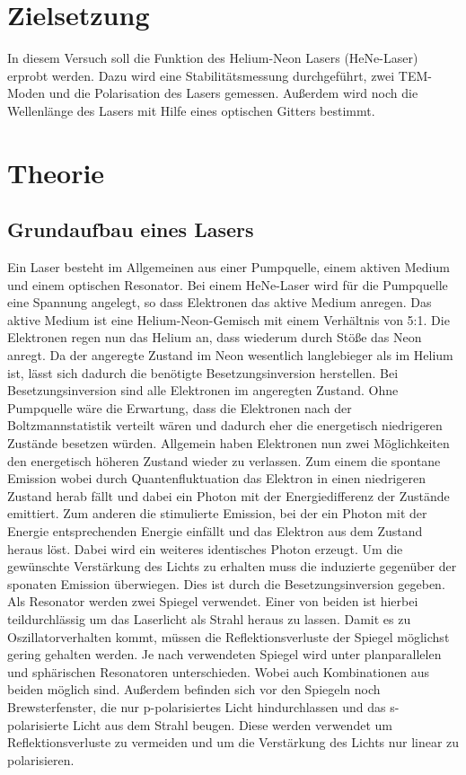 \section{Zielsetzung}
\label{sec:Zielsetzung}
In diesem Versuch soll die Funktion des Helium-Neon Lasers (HeNe-Laser) erprobt werden. Dazu wird eine
Stabilitätsmessung durchgeführt, zwei TEM-Moden und die Polarisation des Lasers gemessen. Außerdem wird noch die
Wellenlänge des Lasers mit Hilfe eines optischen Gitters bestimmt.

\section{Theorie}
\label{sec:Theorie}
\subsection{Grundaufbau eines Lasers}
\label{sec:Laser}
Ein Laser besteht im Allgemeinen aus einer Pumpquelle, einem aktiven Medium und einem optischen Resonator. Bei
einem HeNe-Laser wird für die Pumpquelle eine Spannung angelegt, so dass Elektronen das aktive Medium
anregen. Das aktive Medium ist eine Helium-Neon-Gemisch mit einem Verhältnis von 5:1. Die Elektronen regen
nun das Helium an, dass wiederum durch Stöße das Neon anregt. Da der angeregte Zustand im Neon wesentlich
langlebieger als im Helium ist, lässt sich dadurch die benötigte Besetzungsinversion herstellen. Bei
Besetzungsinversion sind alle Elektronen im angeregten Zustand. Ohne Pumpquelle wäre die Erwartung, dass
die Elektronen nach der Boltzmannstatistik verteilt wären und dadurch eher die energetisch niedrigeren
Zustände besetzen würden. Allgemein haben Elektronen nun zwei Möglichkeiten den energetisch höheren
Zustand wieder zu verlassen. Zum einem die spontane Emission wobei durch Quantenfluktuation das Elektron
in einen niedrigeren Zustand herab fällt und dabei ein Photon mit der Energiedifferenz der Zustände emittiert.
Zum anderen die stimulierte Emission, bei der ein Photon mit der Energie entsprechenden Energie einfällt und
das Elektron aus dem Zustand heraus löst. Dabei wird ein weiteres identisches Photon erzeugt. Um die gewünschte
Verstärkung des Lichts zu erhalten muss die induzierte gegenüber der sponaten Emission überwiegen. Dies ist
durch die Besetzungsinversion gegeben. Als Resonator werden zwei Spiegel verwendet. Einer von beiden ist hierbei
teildurchlässig um das Laserlicht als Strahl heraus zu lassen. Damit es zu Oszillatorverhalten kommt, müssen
die Reflektionsverluste der Spiegel möglichst gering gehalten werden. Je nach verwendeten Spiegel wird unter
planparallelen und sphärischen Resonatoren unterschieden. Wobei auch Kombinationen aus beiden möglich sind.
Außerdem befinden sich vor den Spiegeln noch Brewsterfenster, die nur p-polarisiertes Licht hindurchlassen und
das s-polarisierte Licht aus dem Strahl beugen. Diese werden verwendet um Reflektionsverluste zu vermeiden und
um die Verstärkung des Lichts nur linear zu polarisieren.

